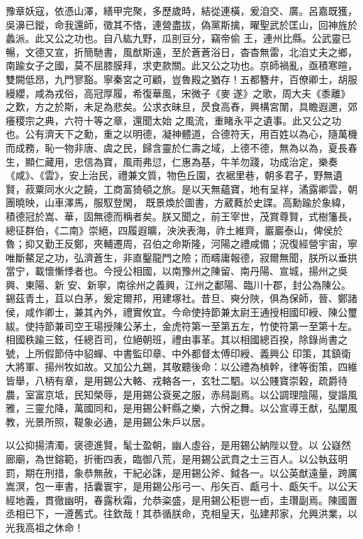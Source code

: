 \begin{pinyinscope}
 豫章妖寇，依憑山澤，繕甲完聚，多歷歲時，結從連橫，爰洎交、廣。呂嘉既獲，吳濞已鏦，命我還師，徵其不恪，連營盡拔，偽黨斯擒，曜聖武於匡山，回神旌於蠡派。此又公之功也。自八紘九野，瓜剖豆分，竊帝偷
 王，連州比縣。公武靈已暢，文德又宣，折簡馳書，風猷斯遠，至於蒼蒼浴日，杳杳無雷，北洎丈夫之鄉，南踰女子之國，莫不屈膝膜拜，求吏款關。此又公之功也。京師禍亂，亟積寒暄，雙闕低昂，九門寥豁。寧秦宮之可顧，豈魯殿之猶存！五都簪弁，百僚卿士，胡服縵纓，咸為戎俗，高冠厚履，希復華風，宋微子《麥遂》之歌，周大夫《黍離》之歎，方之於斯，未足為悲矣。公求衣昧旦，昃食高舂，興構宮闈，具瞻遐邇，郊癢稷宗之典，六符十等之章，還聞太始
 之風流，重睹永平之遺事。此又公之功也。公有濟天下之勳，重之以明德，凝神體道，合德符天，用百姓以為心，隨萬機而成務，恥一物非唐、虞之民，歸含靈於仁壽之域，上德不德，無為以為，夏長春生，顯仁藏用，忠信為寶，風雨弗愆，仁惠為基，牛羊勿踐，功成治定，樂奏《咸》、《雲》，安上治民，禮兼文質，物色丘園，衣裾里巷，朝多君子，野無遺賢，菽粟同水火之饒，工商富猗頓之旅。是以天無蘊寶，地有呈祥，潏露卿雲，朝團曉映，山車澤馬，服馭登閑，
 既景煥於圖書，方葳蕤於史諜。高勳踰於象緯，積德冠於嵩、華，固無德而稱者矣。朕又聞之，前王宰世，茂賞尊賢，式樹籓長，總征群伯，《二南》崇絕，四履遐曠，泱泱表海，祚土維齊，巖巖泰山，俾侯於魯；抑又勤王反鄭，夾輔遷周，召伯之命斯隆，河陽之禮咸備；況復經營宇宙，寧唯斷鰲足之功，弘濟蒼生，非直鑿龍門之險；而疇庸報德，寂爾無聞，朕所以垂拱當宁，載懷慚悸者也。今授公相國，以南豫州之陳留、南丹陽、宣城，揚州之吳興、東陽、新
 安、新寧，南徐州之義興，江州之鄱陽、臨川十郡，封公為陳公。錫茲青土，苴以白茅，爰定爾邦，用建塚社。昔旦、奭分陜，俱為保師，晉、鄭諸侯，咸作卿士，兼其內外，禮實攸宜。今命使持節兼太尉王通授相國印綬、陳公璽紱。使持節兼司空王瑒授陳公茅土，金虎符第一至第五左，竹使符第一至第十左。相國秩踰三鉉，任總百司，位絕朝班，禮由事革。其以相國總百揆，除錄尚書之號，上所假節侍中貂蟬、中書監印章、中外都督太傅印綬、義興公
 印策，其鎮衛大將軍、揚州牧如故。又加公九錫，其敬聽後命：以公禮為楨幹，律等銜策，四維皆舉，八柄有章，是用錫公大輅、戎輅各一，玄牡二駟。以公賤寶崇穀，疏爵待農，室富京坻，民知榮辱，是用錫公袞冕之服，赤舄副焉。以公調理陰陽，燮諧風雅，三靈允降，萬國同和，是用錫公軒縣之樂，六佾之舞。以公宣導王猷，弘闡風教，光景所照，鞮象必通，是用錫公朱戶以居。



 以公抑揚清濁，褒德進賢，髦士盈朝，幽人虛谷，是用錫公納陛以登。以
 公嶷然廊廟，為世鎔範，折衝四表，臨御八荒，是用錫公武賁之士三百人。以公執茲明罰，期在刑措，象恭無赦，干紀必誅，是用錫公斧、鉞各一。以公英猷遠量，跨厲嵩溟，包一車書，括囊寰宇，是用錫公彤弓一、彤矢百、甗弓十、甗矢千。以公天經地義，貫徹幽明，春露秋霜，允恭粢盛，是用錫公秬鬯一卣，圭瓚副焉。陳國置丞相已下，一遵舊式。往欽哉！其恭循朕命，克相皇天，弘建邦家，允興洪業，以光我高祖之休命！




\end{pinyinscope}
